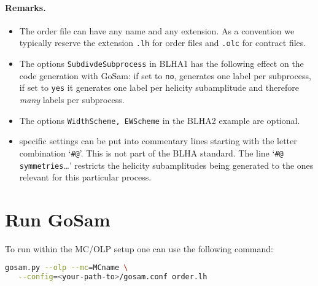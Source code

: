 \paragraph{Remarks.}
\begin{itemize}
\item The order file can have any name and any extension.
      As a convention we typically reserve the extension \texttt{.lh}
      for order files and \texttt{.olc} for contract files.
\item The options \texttt{SubdivdeSubprocess} in BLHA1 has the following effect
      on the code generation with GoSam: if set to 
      \texttt{no}, \gosam{} generates one label per subprocess, if set to
      \texttt{yes} it generates one label per helicity subamplitude
      and therefore \emph{many} labels per subprocess.
      
\item The options \texttt{WidthScheme, EWScheme} in the BLHA2  example are optional.
\item \gosam{} specific settings can be put into commentary lines starting
      with the letter combination `\texttt{\#@}'. This is not part of the
      BLHA standard. The line `\texttt{\#@ symmetries}\dots' restricts the
      helicity subamplitudes being generated to the ones relevant for this
      particular process. 
\end{itemize}

\section{Run GoSam}
To run \gosam{} within the MC/OLP setup one can use the following command:
\begin{lstlisting}[language=bash]
gosam.py --olp --mc=MCname \
   --config=<your-path-to>/gosam.conf order.lh
\end{lstlisting}


